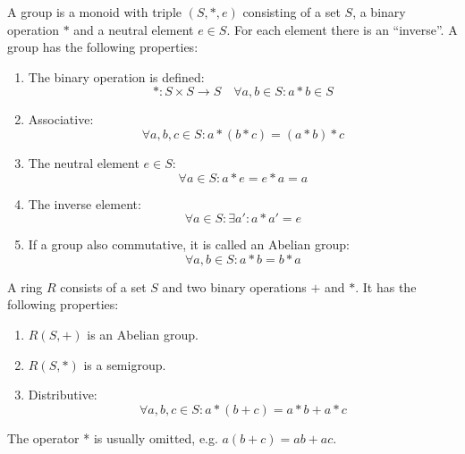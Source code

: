 \begin{definition}[Group]
    A group is a monoid with triple $(S, *, e)$ consisting of a set $S$, a binary operation $*$ and 
    a neutral element $e \in S$.
    For each element there is an ``inverse''.
    A group has the following properties:
    \begin{enumerate}
        \item The binary operation is defined:
            \begin{equation}
                *: S \times S \rightarrow S \quad \forall a,b \in S: a * b \in S
            \end{equation}
        \item Associative:
            \begin{equation}
                \forall a,b,c \in S: a * (b * c) = (a * b) * c
            \end{equation} 
        \item The neutral element $e \in S$:
            \begin{equation}
                \forall a \in S: a * e = e * a = a
            \end{equation}
        \item The inverse element:
            \begin{equation}
                \forall a \in S: \exists a': a * a' = e
            \end{equation}
        \item If a group also commutative, it is called an Abelian group:
        \begin{equation}
            \forall a,b \in S: a * b = b * a
        \end{equation}
    \end{enumerate}
\end{definition}

\begin{definition}[Ring]
    A ring $R$ consists of a set $S$ and two binary operations $+$ and $*$.
    It has the following properties:
    \begin{enumerate}
        \item $R(S,+)$ is an Abelian group.
        \item $R(S,*)$ is a semigroup.
        \item Distributive:
            \begin{equation}
                \forall a,b,c \in S: a * (b + c) = a * b + a * c
            \end{equation}
    \end{enumerate}
    The operator * is usually omitted, e.g. $a (b + c) = ab + ac$.
\end{definition}

